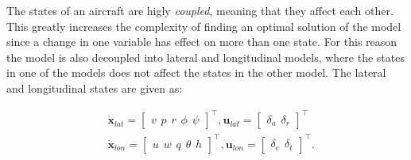 The states of an aircraft are higly \textit{coupled}, meaning that they affect each other. This greatly increases the complexity of finding an optimal solution of the model since a change in one variable has effect on more than one state. For this reason the model is also decoupled into lateral and longitudinal models, where the states in one of the models does not affect the states in the other model. The lateral and longitudinal states are given as:

\begin{equation}
\begin{split}
	&\mathbf{\dot{x}}_{lat} = 
	\begin{bmatrix}
		v \hspace{5pt} p \hspace{5pt} r \hspace{5pt} \phi \hspace{5pt} \psi
	\end{bmatrix} ^\intercal
	, \mathbf{u}_{lat} =
	\begin{bmatrix}
		\delta_a \hspace{5pt} \delta_r
	\end{bmatrix}^\intercal \\
	&\mathbf{\dot{x}}_{lon} =
	\begin{bmatrix}
		u \hspace{5pt} w \hspace{5pt} q \hspace{5pt} \theta \hspace{5pt} h
	\end{bmatrix}^\intercal
	, \mathbf{u}_{lon} =
	\begin{bmatrix}
		\delta_e \hspace{5pt} \delta_t
	\end{bmatrix}^\intercal.
\end{split}
\end{equation}




